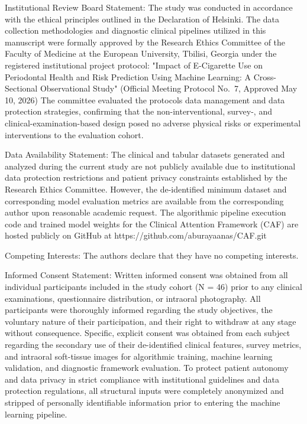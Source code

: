 \documentclass[
]{article}
\begin{document}
Institutional Review Board Statement: The study was conducted in
accordance with the ethical principles outlined in the Declaration of
Helsinki. The data collection methodologies and diagnostic clinical
pipelines utilized in this manuscript were formally approved by the
Research Ethics Committee of the Faculty of Medicine at the European
University, Tbilisi, Georgia under the registered institutional project
protocol: "Impact of E-Cigarette Use on Periodontal Health and Risk
Prediction Using Machine Learning: A Cross-Sectional Observational
Study" (Official Meeting Protocol No.~7, Approved May 10, 2026) The
committee evaluated the protocol\textquotesingle s data management and
data protection strategies, confirming that the non-interventional,
survey-, and clinical-examination-based design posed no adverse physical
risks or experimental interventions to the evaluation cohort.

Data Availability Statement: The clinical and tabular datasets generated
and analyzed during the current study are not publicly available due to
institutional data protection restrictions and patient privacy
constraints established by the Research Ethics Committee. However, the
de-identified minimum dataset and corresponding model evaluation metrics
are available from the corresponding author upon reasonable academic
request. The algorithmic pipeline execution code and trained model
weights for the Clinical Attention Framework (CAF) are hosted publicly
on GitHub at https://github.com/aburayaanas/CAF.git

Competing Interests: The authors declare that they have no competing
interests.

Informed Consent Statement: Written informed consent was obtained from
all individual participants included in the study cohort (N = 46) prior
to any clinical examinations, questionnaire distribution, or intraoral
photography. All participants were thoroughly informed regarding the
study objectives, the voluntary nature of their participation, and their
right to withdraw at any stage without consequence. Specific, explicit
consent was obtained from each subject regarding the secondary use of
their de-identified clinical features, survey metrics, and intraoral
soft-tissue images for algorithmic training, machine learning
validation, and diagnostic framework evaluation. To protect patient
autonomy and data privacy in strict compliance with institutional
guidelines and data protection regulations, all structural inputs were
completely anonymized and stripped of personally identifiable
information prior to entering the machine learning pipeline.
\end{document}
